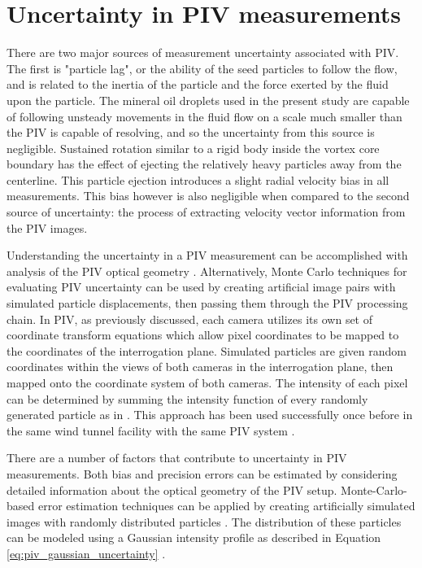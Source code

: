 \section{Uncertainty in PIV measurements}
\label{sec:piv_uncert}

 There are two major sources of measurement uncertainty associated with PIV. 
 The first is "particle lag", or the ability of the seed particles to follow 
 the 
 flow, and is related to the inertia of the particle and the force exerted by 
 the fluid upon the particle. The mineral oil droplets used in the present 
 study are capable of following unsteady movements in the fluid flow on a scale 
 much smaller than the PIV is capable of resolving, and so the uncertainty from 
 this source is negligible. Sustained rotation similar to a rigid body 
 inside the vortex core boundary has the effect of ejecting the relatively 
 heavy particles away from the centerline. This particle ejection introduces a 
 slight radial velocity bias in all measurements. This bias however is also 
 negligible when compared to the second source of uncertainty: the process of 
 extracting velocity vector information from the PIV images.
 
 Understanding the uncertainty in a PIV measurement can be accomplished with 
 analysis of the PIV optical geometry \cite{lawson1997b}. Alternatively, Monte 
 Carlo techniques for evaluating PIV uncertainty can be used by creating 
 artificial image pairs with simulated particle displacements, then passing 
 them through the PIV processing chain. In PIV, as previously discussed, each 
 camera 
 utilizes its own set of coordinate transform equations which allow pixel 
 coordinates to be mapped to the coordinates of the interrogation plane. 
 Simulated particles are given random coordinates within the views of both 
 cameras in the interrogation plane, then mapped onto the coordinate system of 
 both cameras. The intensity of each pixel can be determined by summing the 
 intensity function of every randomly generated particle as in 
 \cite{adeyinka2005,fouras2007}. This approach has been used successfully once 
 before in the same wind tunnel facility with the same PIV system 
 \cite{doan2012}.
 
There are a number of factors that contribute to uncertainty in PIV 
measurements. Both bias and precision errors can be estimated by considering 
detailed information about the optical geometry of the PIV setup. Monte-Carlo- 
based error estimation techniques can be applied by creating artificially 
simulated images with randomly distributed particles \cite{adeyinka2005}. 
The distribution of these particles can be modeled using a Gaussian intensity  
profile as described in Equation 
\ref{eq:piv_gaussian_uncertainty} \cite{raffel1998}.

